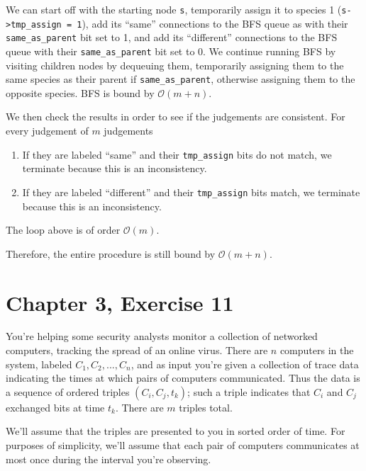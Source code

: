 \documentclass[12pt, letterpaper]{article}
\begin{document}
We can start off with the starting node \verb|s|, temporarily assign it to species 1 (\verb|s->tmp_assign = 1|), add its ``same'' connections to the BFS queue as with their \verb|same_as_parent| bit set to 1, and add its ``different'' connections to the BFS queue with their \verb|same_as_parent| bit set to 0.
We continue running BFS by visiting children nodes by dequeuing them, temporarily assigning them to the same species as their parent if \verb|same_as_parent|, otherwise assigning them to the opposite species.
BFS is bound by $\mathcal{O}(m + n)$.

We then check the results in order to see if the judgements are consistent.
For every judgement of $m$ judgements
\begin{enumerate}
    \item If they are labeled ``same'' and their \verb|tmp_assign| bits do not match, we terminate because this is an inconsistency.
    \item If they are labeled ``different'' and their \verb|tmp_assign| bits match, we terminate because this is an inconsistency.
\end{enumerate}
The loop above is of order $\mathcal{O}(m)$.

Therefore, the entire procedure is still bound by $\mathcal{O}(m + n)$.


\clearpage
\section{Chapter 3, Exercise 11}
You're helping some security analysts monitor a collection of networked computers, tracking the spread of an online virus. 
There are $n$ computers in the system, labeled $C_1, C_2, ... , C_n$, and as input you're given a collection of trace data indicating the times at which pairs of computers communicated. 
Thus the data is a sequence of ordered triples $(C_i , C_j , t_k )$; such a triple indicates that $C_i$ and $C_j$ exchanged bits at time $t_k$. There are $m$ triples total.

We'll assume that the triples are presented to you in sorted order of time. For purposes of simplicity, we'll assume that each pair of computers communicates at most once during the interval you're observing.
\end{document}
